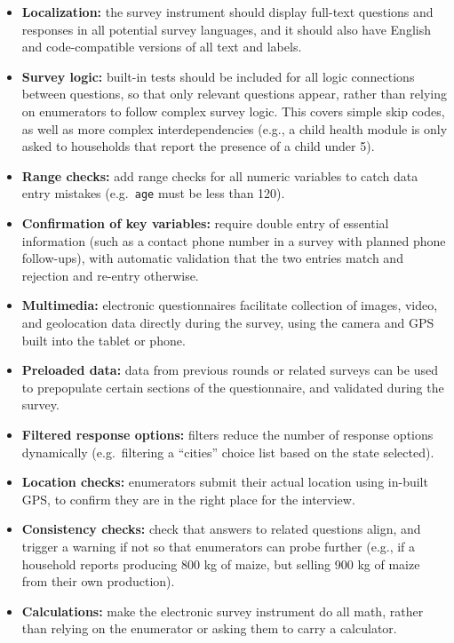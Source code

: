 \documentclass[
]{book}
\providecommand{\tightlist}{%
  \setlength{\itemsep}{0pt}\setlength{\parskip}{0pt}}
\begin{document}
\begin{itemize}
\tightlist
\item
  \textbf{Localization:} the survey instrument should display full-text questions and responses in all potential survey languages, and it should also have English and code-compatible versions of all text and labels.
\item
  \textbf{Survey logic:} built-in tests should be included for all logic connections between questions, so that only relevant questions appear, rather than relying on enumerators to follow complex survey logic. This covers simple skip codes, as well as more complex interdependencies (e.g., a child health module is only asked to households that report the presence of a child under 5).
\item
  \textbf{Range checks:} add range checks for all numeric variables to catch data entry mistakes (e.g.~\texttt{age} must be less than 120).
\item
  \textbf{Confirmation of key variables:} require double entry of essential information (such as a contact phone number in a survey with planned phone follow-ups), with automatic validation that the two entries match and rejection and re-entry otherwise.
\item
  \textbf{Multimedia:} electronic questionnaires facilitate collection of images, video, and geolocation data directly during the survey, using the camera and GPS built into the tablet or phone.
\item
  \textbf{Preloaded data:} data from previous rounds or related surveys can be used to prepopulate certain sections of the questionnaire, and validated during the survey.
\item
  \textbf{Filtered response options:} filters reduce the number of response options dynamically (e.g.~filtering a ``cities'' choice list based on the state selected).
\item
  \textbf{Location checks:} enumerators submit their actual location using in-built GPS, to confirm they are in the right place for the interview.
\item
  \textbf{Consistency checks:} check that answers to related questions align, and trigger a warning if not so that enumerators can probe further (e.g., if a household reports producing 800 kg of maize, but selling 900 kg of maize from their own production).
\item
  \textbf{Calculations:} make the electronic survey instrument do all math, rather than relying on the enumerator or asking them to carry a calculator.
\end{itemize}
\end{document}
